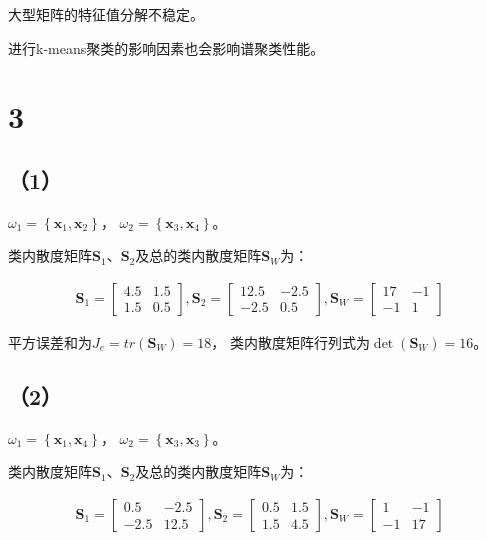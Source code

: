 \documentclass{article}
\begin{document}
大型矩阵的特征值分解不稳定。

进行k-means聚类的影响因素也会影响谱聚类性能。
\section*{3}
\subsection*{（1）}
${\omega _1} = \left\{ {{\pmb{x}_1},{\pmb{x}_2}} \right\}$，
${\omega _2} = \left\{ {{\pmb{x}_3},{\pmb{x}_4}} \right\}$。

类内散度矩阵${\pmb{S}_1}$、${\pmb{S}_2}$及总的类内散度矩阵${\pmb{S}_W}$为：

\begin{align*}
	{\pmb{S}_1} = \left[ {\begin{array}{*{20}{c}}
		{4.5}&{1.5}\\
		{1.5}&{0.5}
		\end{array}} \right],{\pmb{S}_2} = \left[ {\begin{array}{*{20}{c}}
		{12.5}&{-2.5}\\
		{-2.5}&{0.5}
		\end{array}} \right],{\pmb{S}_W} = \left[ {\begin{array}{*{20}{c}}
		{17}&{-1}\\
		{-1}&{1}
		\end{array}} \right]
\end{align*}

平方误差和为${J_e} = tr\left( {{\pmb{S}_W}} \right) = 18$，
类内散度矩阵行列式为$\det \left( {{\pmb{S}_W}} \right) = 16$。

\subsection*{（2）}
${\omega _1} = \left\{ {{\pmb{x}_1},{\pmb{x}_4}} \right\}$，
${\omega _2} = \left\{ {{\pmb{x}_3},{\pmb{x}_3}} \right\}$。

类内散度矩阵${\pmb{S}_1}$、${\pmb{S}_2}$及总的类内散度矩阵${\pmb{S}_W}$为：

\begin{align*}
	{\pmb{S}_1} = \left[ {\begin{array}{*{20}{c}}
		{0.5}&{-2.5}\\
		{-2.5}&{12.5}
		\end{array}} \right],{\pmb{S}_2} = \left[ {\begin{array}{*{20}{c}}
		{0.5}&{1.5}\\
		{1.5}&{4.5}
		\end{array}} \right],{\pmb{S}_W} = \left[ {\begin{array}{*{20}{c}}
		{1}&{-1}\\
		{-1}&{17}
		\end{array}} \right]
\end{align*}
\end{document}
